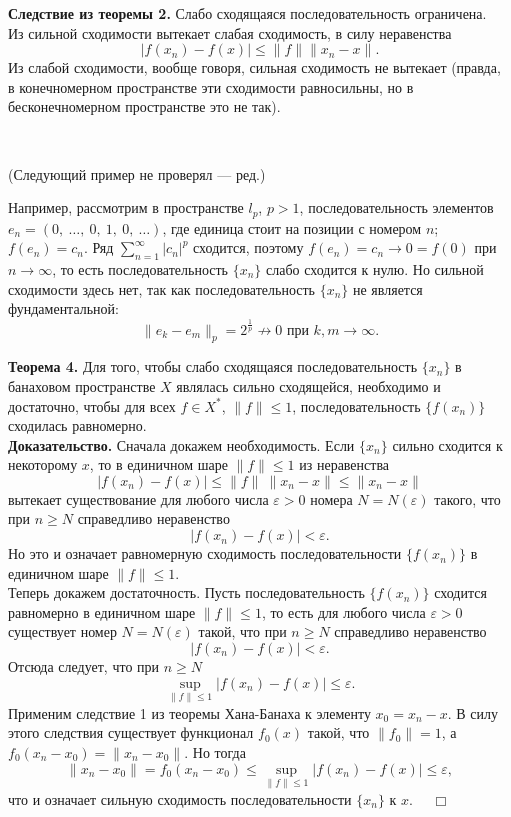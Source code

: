 \documentclass[12pt,a4paper, titlepage]{article}
\begin{document}
\textbf{Следствие из теоремы 2.} Слабо сходящаяся последовательность ограничена.\\

Из сильной сходимости вытекает слабая сходимость, в силу неравенства
$$
|f(x_n) - f(x)| \leqslant \|f\| \|x_n - x\|.
$$
Из слабой сходимости, вообще говоря, сильная сходимость не вытекает (правда, в конечномерном пространстве эти сходимости равносильны, но в бесконечномерном пространстве это не так).

~

(Следующий пример не проверял --- ред.)

Например, рассмотрим в пространстве $l_p$, $p > 1$, последовательность элементов $e_n = (0, \ \dots , \ 0, \ 1, \ 0, \ \dots)$, где единица стоит на позиции с номером $n$; $f(e_n) = c_n$. Ряд $\sum\limits_{n=1}^\infty |c_n|^p$ сходится, поэтому $f(e_n) = c_n \to 0 = f(0)$ при $n\to\infty$, то есть последовательность $\lbrace x_n \rbrace$ слабо сходится к нулю. Но сильной сходимости здесь нет, так как последовательность $\lbrace x_n \rbrace$ не является фундаментальной:
$$
\|e_k - e_m\|_p = 2^{\frac 1 p} \not\to 0 \text{ при } k,m \to \infty.
$$

\textbf{Теорема 4.} Для того, чтобы слабо сходящаяся последовательность $\lbrace x_n \rbrace$ в банаховом пространстве $X$ являлась сильно сходящейся, необходимо и достаточно, чтобы для всех $f \in X^*$, $\|f\| \leqslant 1$, последовательность $\lbrace f(x_n) \rbrace$ сходилась равномерно.\\
\textbf{Доказательство.} Сначала докажем необходимость. Если $\lbrace x_n \rbrace$ сильно сходится к некоторому $x$, то в единичном шаре $\|f\| \leqslant 1$ из неравенства
$$
|f(x_n) - f(x)| \leqslant \|f\| \ \|x_n - x\| \leqslant \|x_n - x\|
$$
вытекает существование для любого числа $\varepsilon > 0$ номера $N = N(\varepsilon)$ такого, что при $n \geqslant N$ справедливо неравенство
$$
|f(x_n) - f(x)| < \varepsilon.
$$
Но это и означает равномерную сходимость последовательности $\lbrace f(x_n) \rbrace$ в единичном шаре $\|f\| \leqslant 1$.\\

Теперь докажем достаточность. Пусть последовательность $\lbrace f(x_n) \rbrace$ сходится равномерно в единичном шаре $\|f\| \leqslant 1$, то есть для любого числа $\varepsilon > 0$ существует номер $N = N(\varepsilon)$ такой, что при $n \geqslant N$ справедливо неравенство
$$
|f(x_n) - f(x)| < \varepsilon.
$$
Отсюда следует, что при $n \geqslant N$
$$
\sup_{\|f\| \leqslant 1} |f(x_n) - f(x)| \leqslant \varepsilon.
$$
Применим следствие 1 из теоремы Хана-Банаха к элементу $x_0 = x_n - x$. В силу этого следствия существует функционал $f_0(x)$ такой, что $\|f_0\| = 1$, а $f_0 (x_n - x_0) = \|x_n - x_0\|$. Но тогда
$$
\|x_n - x_0\| = f_0(x_n - x_0) \leqslant \sup_{\|f\| \leqslant 1} |f(x_n) - f(x)| \leqslant \varepsilon,
$$
что и означает сильную сходимость последовательности  $\lbrace x_n \rbrace$ к $x$. $\quad \Box$\\
\end{document}
